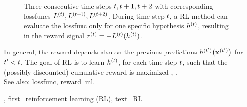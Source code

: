 {{{{\begin{figure}
\begin{center}
		\caption{Three consecutive time steps $t,t+1,t+2$ with corresponding \glspl{lossfunc} $L^{(t)},
		L^{(t+1)}, L^{(t+2)}$. During time step $t$, a RL method can evaluate the 
		\gls{lossfunc} only for one specific \gls{hypothesis} $h^{(t)}$, resulting in the \gls{reward} 
		signal $r^{(t)}=-L^{(t)}(h^{(t)})$.}
			\end{center}
	\end{figure}
	In general, the \gls{reward} depends also on the 
	previous \glspl{prediction} $h^{(t')}\big({\bf x}^{(t')}\big)$ 
	for $t' < t$. The goal of RL is to learn $h^{(t)}$, for 
	each time step $t$, such that the (possibly discounted) cumulative \gls{reward} 
	is maximized \cite{MLBasics}, \cite{SuttonEd2}.
		\\
		See also: \gls{lossfunc}, \gls{reward}, \gls{ml}.},
	first={reinforcement learning (RL)},
	text={RL}
}

}}
